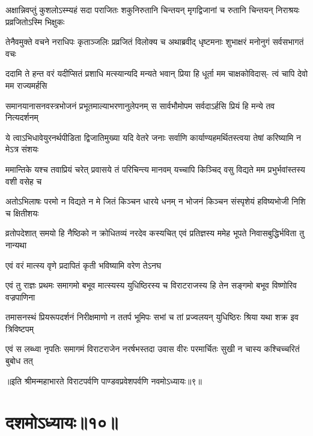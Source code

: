 \fourlineindentedshloka
{अक्षान्निवप्तुं कुशलोऽस्म्यहं सदा}
{पराजितः शकुनिरुतानि चिन्तयन्}
{मृगद्विजानां च रुतानि चिन्तयन्}
{निराश्रयः प्रव्रजितोऽस्मि भिक्षुकः}



\fourlineindentedshloka
{तेनैवमुक्ते वचने नराधिपः}
{कृताञ्जलिः प्रव्रजितं विलोक्य च}
{अथाब्रवीद् धृष्टमनाः शुभाक्षरं}
{मनोनुगं सर्वसभागतं वचः}


\fourlineindentedshloka
{ददामि ते हन्त वरं यदीप्सितं}
{प्रशाधि मत्स्यान्यदि मन्यते भवान्}
{प्रिया हि धूर्ता मम चाक्षकोविदास्-}
{त्वं चापि देवो मम राज्यमर्हसि}


\fourlineindentedshloka
{समानयानासनवस्त्रभोजनं}
{प्रभूतमाल्याभरणानुलेपनम्}
{स सार्वभौमोपम सर्वदाऽर्हसि}
{प्रियं हि मन्ये तव नित्यदर्शनम्}


\fourlineindentedshloka
{ये त्वाऽभिधावेयुरनर्थपीडिता}
{द्विजातिमुख्या यदि वेतरे जनाः}
{सर्वाणि कार्याण्यहमर्थितस्त्वया}
{तेषां करिष्यामि न मेऽत्र संशयः}


\fourlineindentedshloka
{ममान्तिके यश्च तवाप्रियं चरेत्}
{प्रवासये तं परिचिन्त्य मानवम्}
{यच्चापि किञ्चिद् वसु विद्यते मम}
{प्रभुर्भवांस्तस्य वशी वसेह च}




\fourlineindentedshloka
{अतोऽभिलाषः परमो न विद्यते}
{न मे जितं किञ्चन धारये धनम्}
{न भोजनं किञ्चन संस्पृशेयं}
{हविष्यभोजी निशि च क्षितीशयः}


\fourlineindentedshloka
{व्रतोपदेशात् समयो हि नैष्ठिको}
{न क्रोधितव्यं नरदेव कस्यचित्}
{एवं प्रतिज्ञस्य ममेह भूपते}
{निवासबुद्धिर्भविता तु नान्यथा}


\onelineindentedshloka
{एवं वरं मात्स्य वृणे प्रदापितं}
{कृती भविष्यामि वरेण तेऽनघ}



\fourlineindentedshloka
{एवं तु राज्ञः प्रथमः समागमो}
{बभूव मात्स्यस्य युधिष्ठिरस्य च}
{विराटराजस्य हि तेन सङ्गमो}
{बभूव विष्णोरिव वज्रपाणिना}


\fourlineindentedshloka
{तमासनस्थं प्रियरूपदर्शनं}
{निरीक्षमाणो न ततर्प भूमिपः}
{सभां च तां प्रज्वलयन् युधिष्ठिरः}
{श्रिया यथा शक्र इव त्रिविष्टपम्}


\fourlineindentedshloka
{एवं स लब्ध्वा नृपतिः समागमं}
{विराटराजेन नरर्षभस्तदा}
{उवास वीरः परमार्चितः सुखी}
{न चास्य कश्चिच्चरितं बुबोध तत्}

॥इति श्रीमन्महाभारते विराटपर्वणि पाण्डवप्रवेशपर्वणि नवमोऽध्यायः॥९॥

\chapter{दशमोऽध्यायः॥१०॥}

